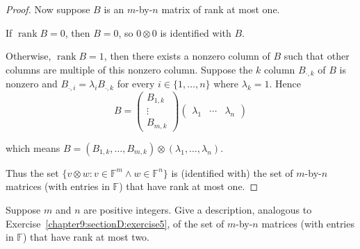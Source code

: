 \begin{proof}
    Now suppose $B$ is an $m$-by-$n$ matrix of rank at most one.

    If $\operatorname{rank} B = 0$, then $B = 0$, so $0\otimes 0$ is identified with $B$.

    Otherwise, $\operatorname{rank} B = 1$, then there exists a nonzero column of $B$ such that other columns are multiple of this nonzero column. Suppose the $k$ column $B_{\cdot,k}$ of $B$ is nonzero and $B_{\cdot,i} = \lambda_{i}B_{\cdot,k}$ for every $i\in\{1,\ldots,n\}$ where $\lambda_{k} = 1$. Hence
    \[
        B = \begin{pmatrix}B_{1,k} \\ \vdots \\ B_{m,k}\end{pmatrix}\begin{pmatrix}\lambda_{1} & \cdots & \lambda_{n}\end{pmatrix}
    \]

    which means $B = (B_{1,k}, \ldots, B_{m,k})\otimes (\lambda_{1}, \ldots, \lambda_{n})$.

    Thus the set $\{ v\otimes w: v\in\mathbb{F}^{m}\land w\in\mathbb{F}^{n} \}$ is (identified with) the set of $m$-by-$n$ matrices (with entries in $\mathbb{F}$) that have rank at most one.
\end{proof}
\newpage

\begin{exercise}\label{chapter9:sectionD:exercise6}
    Suppose $m$ and $n$ are positive integers. Give a description, analogous to Exercise~\ref{chapter9:sectionD:exercise5}, of the set of $m$-by-$n$ matrices (with entries in $\mathbb{F}$) that have rank at most two.
\end{exercise}

